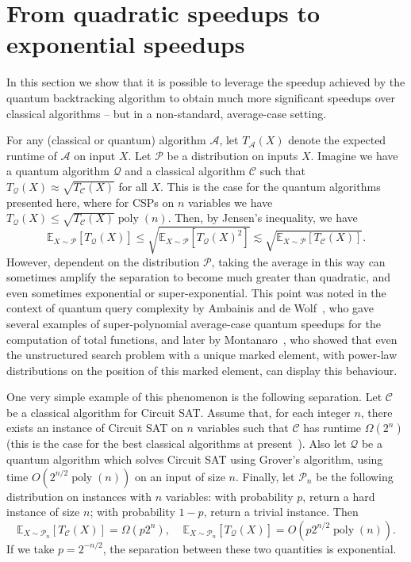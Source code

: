 \documentclass[11pt]{article}
\newcommand{\E}{\mathbb{E}}
\DeclareMathOperator{\poly}{poly}
\begin{document}

\section{From quadratic speedups to exponential speedups}
\label{sec:averagecase}

In this section we show that it is possible to leverage the speedup achieved by the quantum backtracking algorithm to obtain much more significant speedups over classical algorithms -- but in a non-standard, average-case setting.

For any (classical or quantum) algorithm $\mathcal{A}$, let $T_\mathcal{A}(X)$ denote the expected runtime of $\mathcal{A}$ on input $X$. Let $\mathcal{P}$ be a distribution on inputs $X$. Imagine we have a quantum algorithm $\mathcal{Q}$ and a classical algorithm $\mathcal{C}$ such that $T_\mathcal{Q}(X) \approx \sqrt{ T_\mathcal{C}(X)}$ for all $X$. This is the case for the quantum algorithms presented here, where for CSPs on $n$ variables we have $T_\mathcal{Q}(X) \le \sqrt{T_\mathcal{C}(X)} \poly(n)$. Then, by Jensen's inequality, we have
%
\[ \E_{X \sim \mathcal{P}}[T_{\mathcal{Q}}(X)] \le \sqrt{\E_{X \sim \mathcal{P}}[T_{\mathcal{Q}}(X)^2]}  \lesssim \sqrt{\E_{X \sim \mathcal{P}}[T_{\mathcal{C}}(X)]}. \]
%
However, dependent on the distribution $\mathcal{P}$, taking the average in this way can sometimes amplify the separation to become much greater than quadratic, and even sometimes exponential or super-exponential. This point was noted in the context of quantum query complexity by Ambainis and de Wolf~\cite{ambainis01}, who gave several examples of super-polynomial average-case quantum speedups for the computation of total functions, and later by Montanaro~\cite{montanaro10}, who showed that even the unstructured search problem with a unique marked element, with power-law distributions on the position of this marked element, can display this behaviour.

One very simple example of this phenomenon is the following separation. Let $\mathcal{C}$ be a classical algorithm for Circuit SAT. Assume that, for each integer $n$, there exists an instance of Circuit SAT on $n$ variables such that $\mathcal{C}$ has runtime $\Omega(2^n)$ (this is the case for the best classical algorithms at present~\cite{williams13}). Also let $\mathcal{Q}$ be a quantum algorithm which solves Circuit SAT using Grover's algorithm, using time $O(2^{n/2} \poly(n))$ on an input of size $n$. Finally, let $\mathcal{P}_n$ be the following distribution on instances with $n$ variables: with probability $p$, return a hard instance of size $n$; with probability $1-p$, return a trivial instance. Then
%
\[ \E_{X \sim \mathcal{P}_n}[T_{\mathcal{C}}(X)] = \Omega(p 2^n), \;\;\;\; \E_{X \sim \mathcal{P}_n}[T_{\mathcal{Q}}(X)] = O(p 2^{n/2} \poly(n)). \]
%
If we take $p = 2^{-n/2}$, the separation between these two quantities is exponential.
\end{document}
